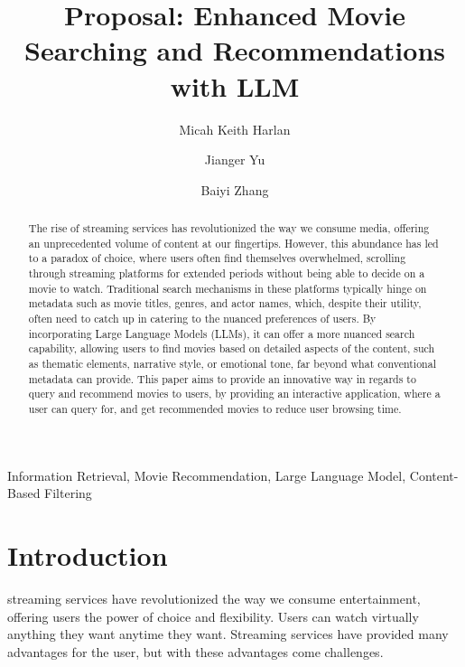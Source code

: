 \documentclass[journal]{IEEEtran}
\begin{document}
\title{Proposal: Enhanced Movie Searching and Recommendations with LLM}

\author[1]{Micah Keith Harlan}
\author[1]{Jianger Yu}
\author[1]{Baiyi Zhang}


\maketitle

\begin{abstract}
The rise of streaming services has revolutionized the way we consume media, offering an unprecedented volume of content at our fingertips. However, this abundance has led to a paradox of choice, where users often find themselves overwhelmed, scrolling through streaming platforms for extended periods without being able to decide on a movie to watch. Traditional search mechanisms in these platforms typically hinge on metadata such as movie titles, genres, and actor names, which, despite their utility, often need to catch up in catering to the nuanced preferences of users. By incorporating Large Language Models (LLMs), it can offer a more nuanced search capability, allowing users to find movies based on detailed aspects of the content, such as thematic elements, narrative style, or emotional tone, far beyond what conventional metadata can provide. This paper aims to provide an innovative way in regards to query and recommend movies to users, by providing an interactive application, where a user can query for, and get recommended movies to reduce user browsing time.
\end{abstract}

\begin{IEEEkeywords}
Information Retrieval, Movie Recommendation, Large Language Model, Content-Based Filtering
\end{IEEEkeywords}

\section{Introduction}
 streaming services have revolutionized the way we consume entertainment, offering users the power of choice and flexibility. Users can watch virtually anything they want anytime they want. Streaming services have provided many advantages for the user, but with these advantages come challenges. 
\end{document}
